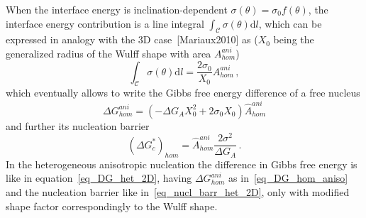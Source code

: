 When the interface energy is inclination-dependent $\sigma(\theta)=\sigma_0 f(\theta)$, the interface energy contribution is a line integral $\int_\mathcal{C} \sigma(\theta) \mathrm{d}l$, which can be expressed in analogy with the 3D case~[Mariaux2010] as ($X_0$ being the generalized radius of the Wulff shape with area $A_{hom}^{ani}$)
\begin{equation}
	\int_\mathcal{C} \sigma(\theta) \mathrm{d}l = \frac{2\sigma_0}{X_0}A_{hom}^{ani} \,,    
\end{equation}
which eventually allows to write the Gibbs free energy difference of a free nucleus
\begin{equation}\label{eq_DG_hom_aniso}
	\Delta G_{hom}^{ani} = (-\Delta G_A X_0^2 + 2\sigma_0 X_0)\hat{A}_{hom}^{ani} 
\end{equation}
and further its nucleation barrier
\begin{equation} 
	(\Delta G_c^*)_{hom} = \hat{A}_{hom}^{ani}\frac{2\sigma^2}{\Delta G_A}\,.
\end{equation}
In the heterogeneous anisotropic nucleation the difference in Gibbs free energy is like in equation~\eqref{eq_DG_het_2D}, having $\Delta G_{hom}^{ani}$ as in~\eqref{eq_DG_hom_aniso} and the nucleation barrier like in~\eqref{eq_nucl_barr_het_2D}, only with modified shape factor correspondingly to the Wulff shape.
\begin{figure}
\end{figure}
	



